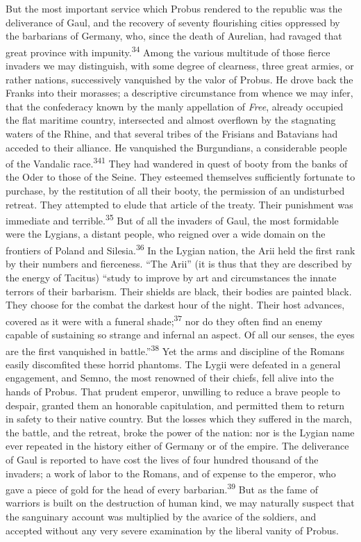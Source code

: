 But the most important service which Probus rendered to the
republic was the deliverance of Gaul, and the recovery of seventy
flourishing cities oppressed by the barbarians of Germany, who,
since the death of Aurelian, had ravaged that great province with
impunity.\textsuperscript{34} Among the various multitude of those fierce invaders
we may distinguish, with some degree of clearness, three great
armies, or rather nations, successively vanquished by the valor
of Probus. He drove back the Franks into their morasses; a
descriptive circumstance from whence we may infer, that the
confederacy known by the manly appellation of \textit{Free}, already
occupied the flat maritime country, intersected and almost
overflown by the stagnating waters of the Rhine, and that several
tribes of the Frisians and Batavians had acceded to their
alliance. He vanquished the Burgundians, a considerable people of
the Vandalic race.\textsuperscript{341} They had wandered in quest of booty from
the banks of the Oder to those of the Seine. They esteemed
themselves sufficiently fortunate to purchase, by the restitution
of all their booty, the permission of an undisturbed retreat.
They attempted to elude that article of the treaty. Their
punishment was immediate and terrible.\textsuperscript{35} But of all the invaders
of Gaul, the most formidable were the Lygians, a distant people,
who reigned over a wide domain on the frontiers of Poland and
Silesia.\textsuperscript{36} In the Lygian nation, the Arii held the first rank by
their numbers and fierceness. “The Arii” (it is thus that they
are described by the energy of Tacitus) “study to improve by art
and circumstances the innate terrors of their barbarism. Their
shields are black, their bodies are painted black. They choose
for the combat the darkest hour of the night. Their host
advances, covered as it were with a funeral shade;\textsuperscript{37} nor do they
often find an enemy capable of sustaining so strange and infernal
an aspect. Of all our senses, the eyes are the first vanquished
in battle.”\textsuperscript{38} Yet the arms and discipline of the Romans easily
discomfited these horrid phantoms. The Lygii were defeated in a
general engagement, and Semno, the most renowned of their chiefs,
fell alive into the hands of Probus. That prudent emperor,
unwilling to reduce a brave people to despair, granted them an
honorable capitulation, and permitted them to return in safety to
their native country. But the losses which they suffered in the
march, the battle, and the retreat, broke the power of the
nation: nor is the Lygian name ever repeated in the history
either of Germany or of the empire. The deliverance of Gaul is
reported to have cost the lives of four hundred thousand of the
invaders; a work of labor to the Romans, and of expense to the
emperor, who gave a piece of gold for the head of every
barbarian.\textsuperscript{39} But as the fame of warriors is built on the
destruction of human kind, we may naturally suspect that the
sanguinary account was multiplied by the avarice of the soldiers,
and accepted without any very severe examination by the liberal
vanity of Probus.


